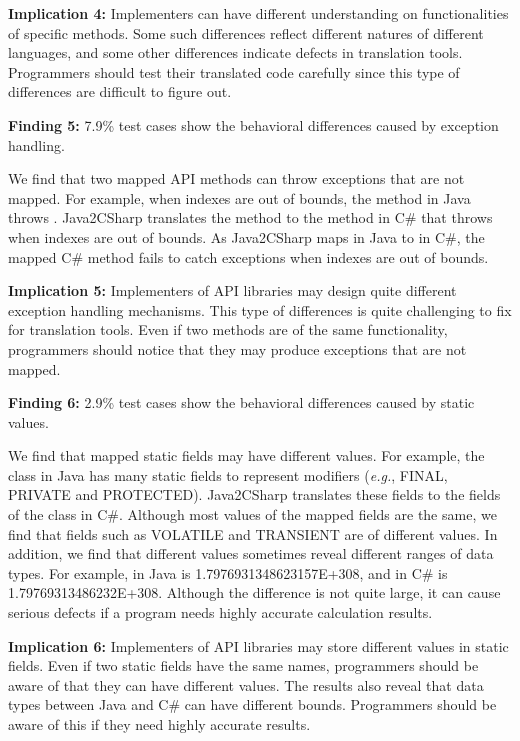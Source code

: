 \textbf{Implication 4:} Implementers can have different understanding on functionalities of specific methods. Some such differences reflect different natures of different languages, and some other differences indicate  defects in translation tools. Programmers should test their translated code carefully since this type of differences are difficult to figure out.

\textbf{Finding 5:} 7.9\% test cases show the behavioral differences caused by exception handling.

We find that two mapped API methods can throw exceptions that are not mapped. For example, when indexes are out of bounds, the  method in Java throws . Java2CSharp translates the method to the  method in C\# that throws  when indexes are out of bounds. As Java2CSharp maps  in Java to  in C\#, the mapped C\# method fails to catch exceptions when indexes are out of bounds.

\textbf{Implication 5:} Implementers of API libraries may design quite different exception handling mechanisms. This type of differences is quite challenging to fix for translation tools. Even if two methods are of the same functionality, programmers should notice that they may produce exceptions that are not mapped.

\textbf{Finding 6:} 2.9\% test cases show the behavioral differences caused by static values.


We find that mapped static fields may have different values. For example, the  class in Java has many static fields to represent modifiers (\emph{e.g.}, FINAL, PRIVATE and PROTECTED). Java2CSharp translates these fields to the fields of the  class in C\#. Although most values of the mapped fields are the same, we find that fields such as VOLATILE and TRANSIENT are of different values. In addition, we find that different values sometimes reveal different ranges of data types. For example,  in Java is 1.7976931348623157E+308, and  in C\# is 1.79769313486232E+308.  Although the difference is not quite large, it can cause serious defects if a program needs highly accurate calculation results.

\textbf{Implication 6:} Implementers of API libraries may store different values in static fields. Even if two static fields have the same names, programmers should be aware of that they can have different values. The results also reveal that data types between Java and C\# can have different bounds. Programmers should be aware of this if they need highly accurate results.

